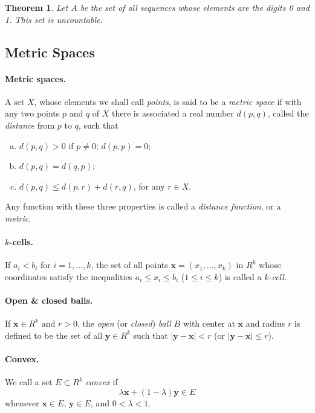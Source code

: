 \documentclass{article}
\newtheorem{theorem}{Theorem}
\numberwithin{theorem}{section}
\begin{document}
\setcounter{theorem}{13}
\begin{theorem}
  Let $A$ be the set of all sequences whose elements are the digits 0 and 1.
  This set is uncountable.
\end{theorem}

\subsection*{Metric Spaces}

\paragraph{Metric spaces.} A set $X$, whose elements we shall call
\emph{points}, is said to be a \emph{metric space} if with any two points $p$
and $q$ of $X$ there is associated a real number $d(p, q)$, called the
\emph{distance} from $p$ to $q$, such that
\begin{enumerate}[(a)]
  \item $d(p, q) > 0$ if $p \neq 0$; $d(p, p) = 0$;
  \item $d(p, q) = d(q, p)$;
  \item $d(p, q) \leq d(p, r) + d(r, q)$, for any $r \in X$.
\end{enumerate}
Any function with these three properties is called a \emph{distance function},
or a \emph{metric}.

\paragraph{$k$-cells.} If $a_i < b_i$ for $i = 1, \ldots, k$, the set of all
points $\mathbf{x} = (x_1, \ldots, x_k)$ in $R^k$ whose coordinates satisfy the
inequalities $a_i \leq x_i \leq b_i$ ($1 \leq i \leq k$) is called a
\emph{$k$-cell}.

\paragraph{Open \& closed balls.} If $\mathbf{x} \in R^k$ and $r > 0$, the
\emph{open} (or \emph{closed}) \emph{ball} $B$ with center at $\mathbf{x}$ and
radius $r$ is defined to be the set of all $\mathbf{y} \in R^k$ such that
$|\mathbf{y} - \mathbf{x}| < r$ (or $|\mathbf{y} - \mathbf{x}| \leq r$).

\paragraph{Convex.} We call a set $E \subset R^k$ \emph{convex} if \[
  \lambda\mathbf{x} + (1 - \lambda)\mathbf{y} \in E
\] whenever $\mathbf{x} \in E$, $\mathbf{y} \in E$, and $0 < \lambda < 1$.
\end{document}
